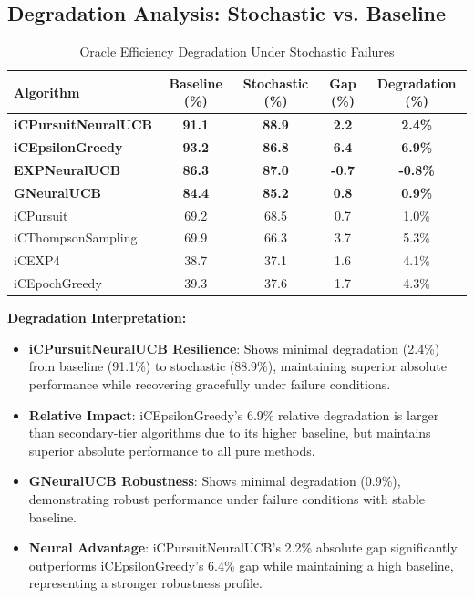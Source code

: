 \documentclass[12pt,a4paper]{article}
\newcommand{\primarytext}[1]{\textcolor{primaryblue}{\textbf{#1}}}
\newcommand{\success}[1]{\textcolor{accentgreen}{\textbf{#1}}}
\newcommand{\legacy}[1]{\textcolor{legacycolor}{\textbf{#1}}}
\newcommand{\neural}[1]{\textcolor{neuralcolor}{\textbf{#1}}}
\begin{document}
\subsection{Degradation Analysis: Stochastic vs. Baseline}

\begin{table}[H]
\centering
\caption{Oracle Efficiency Degradation Under Stochastic Failures}
\label{tab:degradation-analysis}
\begin{tabular}{@{}lcccc@{}}\toprule
\textbf{Algorithm} & \textbf{Baseline (\%)} & \textbf{Stochastic (\%)} & \textbf{Gap (\%)} & \textbf{Degradation (\%)} \\\midrule
\neural{iCPursuitNeuralUCB}   & \neural{91.1} & \neural{88.9} & \neural{2.2} & \neural{2.4\%} \\
\primarytext{iCEpsilonGreedy}   & \primarytext{93.2} & \primarytext{86.8} & \primarytext{6.4} & \primarytext{6.9\%} \\
\legacy{EXPNeuralUCB}           & \legacy{86.3} & \legacy{87.0} & \legacy{-0.7} & \legacy{-0.8\%} \\
\neural{GNeuralUCB}            & \neural{84.4} & \neural{85.2} & \neural{0.8} & \neural{0.9\%} \\
iCPursuit                       & 69.2 & 68.5 & 0.7 & 1.0\% \\
iCThompsonSampling              & 69.9 & 66.3 & 3.7 & 5.3\% \\
iCEXP4                          & 38.7 & 37.1 & 1.6 & 4.1\% \\
iCEpochGreedy                   & 39.3 & 37.6 & 1.7 & 4.3\% \\\bottomrule
\end{tabular}
\end{table}

\textbf{Degradation Interpretation:}
\begin{itemize}
\item \neural{iCPursuitNeuralUCB Resilience}: Shows minimal degradation (2.4\%) from baseline (91.1\%) to stochastic (88.9\%), maintaining superior absolute performance while recovering gracefully under failure conditions.
\item \primarytext{Relative Impact}: iCEpsilonGreedy's 6.9\% relative degradation is larger than secondary-tier algorithms due to its higher baseline, but maintains superior absolute performance to all pure methods.
\item \neural{GNeuralUCB Robustness}: Shows minimal degradation (0.9\%), demonstrating robust performance under failure conditions with stable baseline.
\item \success{Neural Advantage}: iCPursuitNeuralUCB's 2.2\% absolute gap significantly outperforms iCEpsilonGreedy's 6.4\% gap while maintaining a high baseline, representing a stronger robustness profile.
\end{itemize}
\end{document}
